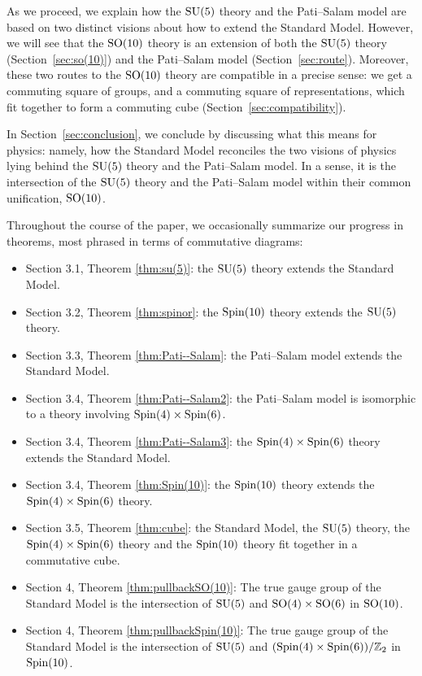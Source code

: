 \documentclass{article}
\newcommand{\SO}{{\rm SO}}    %
\newcommand{\SU}{{\rm SU}}    %
\newcommand{\Spin}{{\rm Spin}}    %
\begin{document}
As we proceed, we explain how the $\SU(5)$ theory and the Pati--Salam
model are based on two distinct visions about how to extend the
Standard Model.  However, we will see that the $\SO(10)$ theory is an
extension of both the $\SU(5)$ theory (Section~\ref{sec:so(10)}) and
the Pati--Salam model (Section~\ref{sec:route}). Moreover, these two
routes to the $\SO(10)$ theory are compatible in a precise sense: we
get a commuting square of groups, and a commuting square of
representations, which fit together to form a commuting cube
(Section~\ref{sec:compatibility}).

In Section~\ref{sec:conclusion}, we conclude by discussing what this
means for physics: namely, how the Standard Model reconciles the 
two visions of physics lying behind the
$\SU(5)$ theory and the Pati--Salam model.  In a sense, it is the
intersection of the $\SU(5)$ theory and the Pati--Salam model within
their common unification, $\SO(10)$.

Throughout the course of the paper, we occasionally summarize our 
progress in theorems, most phrased in terms of commutative
diagrams:

\begin{itemize}
\item Section 3.1, Theorem \ref{thm:su(5)}: the $\SU(5)$ theory extends the
Standard Model.
\item Section 3.2, Theorem \ref{thm:spinor}: the $\Spin(10)$ theory extends
the $\SU(5)$ theory.
\item Section 3.3, Theorem \ref{thm:Pati--Salam}: the Pati--Salam model 
extends the Standard Model.
\item Section 3.4, Theorem \ref{thm:Pati--Salam2}: the Pati--Salam model 
is isomorphic to a theory involving $\Spin(4) \times \Spin(6)$.
\item Section 3.4, Theorem \ref{thm:Pati--Salam3}: the $\Spin(4) \times 
\Spin(6)$ theory extends the Standard Model.
\item Section 3.4, Theorem \ref{thm:Spin(10)}: the $\Spin(10)$ theory extends
the $\Spin(4) \times \Spin(6)$ theory.
\item Section 3.5, Theorem \ref{thm:cube}: the Standard Model, the $\SU(5)$
theory, the $\Spin(4) \times \Spin(6)$ theory and the $\Spin(10)$
theory fit together in a commutative cube.
\item Section 4, Theorem \ref{thm:pullbackSO(10)}: The true gauge group of
the Standard Model is the intersection of $\SU(5)$ and $\SO(4) \times
\SO(6)$ in $\SO(10)$.
\item Section 4, Theorem \ref{thm:pullbackSpin(10)}: The true gauge group of
the Standard Model is the intersection of $\SU(5)$ and $(\Spin(4) \times
\Spin(6))/\mathbb{Z}_2$ in $\Spin(10)$.
\end{itemize}
\end{document}
